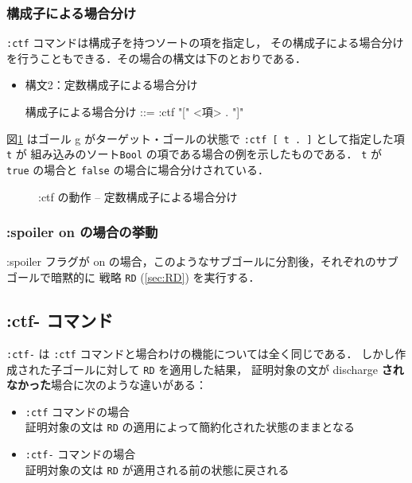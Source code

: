 \documentclass[a4paper,oneside,10pt,here]{memoir}
\newenvironment{vvtm}%
{\parskip=0pt\lineskip=0pt\begin{center}\begin{minipage}{0.8\textwidth}\begin{snugshade}}%
  {\end{snugshade}\end{minipage}\end{center}}
\begin{document}
\subsubsection{構成子による場合分け}
\texttt{:ctf} コマンドは構成子を持つソートの項を指定し，
その構成子による場合分けを行うこともできる．その場合の構文は下のとおりである．
\begin{itemize}
\item 構文2：定数構成子による場合分け
  \begin{vvtm}
    \begin{simplev}
      構成子による場合分け ::= :ctf "[" <項> . "]"
    \end{simplev}
  \end{vvtm}
\end{itemize}
図\ref{fig:ctf2} はゴール g がターゲット・ゴールの状態で
 \texttt{:ctf [ t . ]} として指定した項 \texttt{t} が
組み込みのソート\texttt{Bool} の項である場合の例を示したものである．
\texttt{t} が \texttt{true} の場合と \texttt{false} の場合に場合分けされている．
\begin{figure}[hbt]
  \centering
  
  \caption{:ctf の動作 -- 定数構成子による場合分け}
  \label{fig:ctf2}
\end{figure}


\subsubsection{:spoiler on の場合の挙動}
:spoiler フラグが on の場合，このようなサブゴールに分割後，それぞれのサブゴールで暗黙的に
戦略 \texttt{RD} (\ref{sec:RD}) を実行する．

\subsection{:ctf- コマンド}\label{sec:ctf-}

\texttt{:ctf-} は \texttt{:ctf} コマンドと場合わけの機能については全く同じである．
しかし作成された子ゴールに対して \texttt{RD} を適用した結果，
証明対象の文が discharge \textbf{されなかった}場合に次のような違いがある：
\begin{itemize}
\item \texttt{:ctf} コマンドの場合\\
  証明対象の文は \texttt{RD} の適用によって簡約化された状態のままとなる
\item \texttt{:ctf-} コマンドの場合\\
  証明対象の文は \texttt{RD} が適用される前の状態に戻される
\end{itemize}
\end{document}
